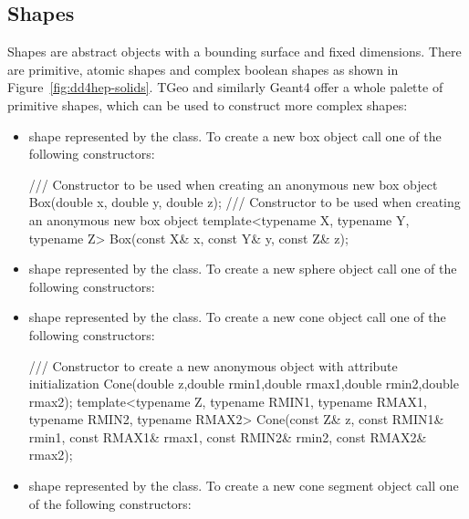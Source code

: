 \documentclass[10pt,a4paper]{article}
\begin{document}
\subsection{Shapes}
\label{dd4hep-basic-shapes}
\noindent
Shapes are abstract objects with a bounding surface and fixed dimensions. 
There are primitive, atomic shapes
and complex boolean shapes as shown in Figure~\ref{fig:dd4hep-solids}. 
TGeo and similarly Geant4 offer a whole palette of
primitive shapes, which can be used to construct more complex shapes:
\begin{itemize}\itemcompact
\item {} shape
    represented by the  class. To create a new box
    object call one of the following constructors:
\begin{code}
/// Constructor to be used when creating an anonymous new box object
Box(double x, double y, double z);
/// Constructor to be used when creating an anonymous new box object
template<typename X, typename Y, typename Z> Box(const X& x, const Y& y, const Z& z);
\end{code}
\item {} shape
    represented by the  class. To create a new sphere
    object call one of the following constructors:
\begin{code}
\end{code}
\item {}  shape
    represented by the  class. To create a new cone
    object call one of the following constructors:
\begin{code}
/// Constructor to create a new anonymous object with attribute initialization
Cone(double z,double rmin1,double rmax1,double rmin2,double rmax2);
template<typename Z, typename RMIN1, typename RMAX1, typename RMIN2, typename RMAX2>
Cone(const Z& z, const RMIN1& rmin1, const RMAX1& rmax1, const RMIN2& rmin2, const RMAX2& rmax2);
\end{code}
\item {} shape
    represented by the  class. To create a new cone segment
    object call one of the following constructors:
\begin{code}

\end{code}
\end{itemize}
\end{document}
